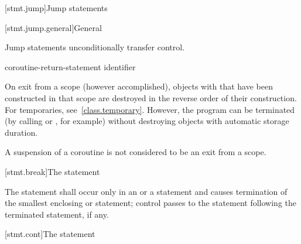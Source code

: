 [stmt.jump]{Jump statements}%

[stmt.jump.general]{General}%

\pnum
Jump statements unconditionally transfer control.
%

%
%
%
%
%
%
\begin{bnf}
\br
     \terminal{;}\br
     \terminal{;}\br
      \terminal{;}\br
    coroutine-return-statement\br
     identifier \terminal{;}
\end{bnf}

\pnum
{}%
%
\begin{note}
On exit from a scope (however accomplished), objects with  that have been constructed in that scope are destroyed
in the reverse order of their construction.
For temporaries, see~\ref{class.temporary}.
However, the program can be terminated (by calling
%
%
 or
%
%
, for example) without
destroying objects with automatic storage duration.
\end{note}
\begin{note}
A suspension of a coroutine is not considered to be an exit from a scope.
\end{note}

[stmt.break]{The  statement}%

\pnum
The  statement shall occur only in an
%
%
 or a  statement and causes
termination of the smallest enclosing  or
 statement; control passes to the statement following the
terminated statement, if any.

[stmt.cont]{The  statement}%

